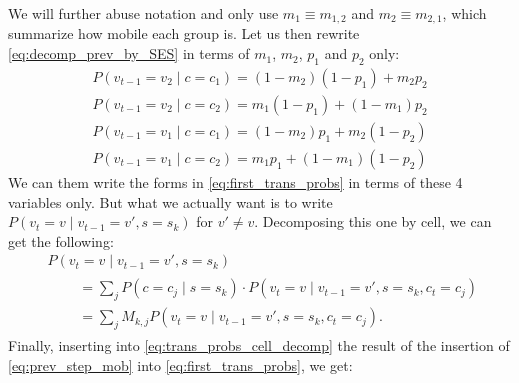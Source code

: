 \documentclass[../thesis.tex]{subfiles}
\begin{document}
We will further abuse notation and only use $m_1 \equiv
m_{1,2}$ and $m_2 \equiv m_{2, 1}$, which summarize how mobile each group is. Let us then rewrite
\eqref{eq:decomp_prev_by_SES} in terms of $m_1$, $m_2$, $p_1$ and $p_2$ only:
\begin{equation}
    \label{eq:prev_step_mob}
    \begin{aligned}
        P(v_{t-1} = v_2 \mid c = c_1)
            = (1 - m_2) (1 - p_1) + m_2 p_2
        \\
        P(v_{t-1} = v_2 \mid c = c_2)
            = m_1 (1 - p_1) + (1 - m_1) p_2
        \\
        P(v_{t-1} = v_1 \mid c = c_1)
            = (1 - m_2) p_1 + m_2 (1 - p_2)
        \\
        P(v_{t-1} = v_1 \mid c = c_2)
            = m_1 p_1 + (1 - m_1) (1 - p_2)
    \end{aligned}
\end{equation}
We can them write the forms in \eqref{eq:first_trans_probs} in terms of these 4
variables only. But what we actually want is to write $P(v_t = v \mid v_{t-1} = v', s
= s_k)$ for $v' \neq v$. Decomposing this one by cell, we can get the following:
\begin{equation}
    \label{eq:trans_probs_cell_decomp}
    \begin{aligned}
        & P(v_t = v \mid v_{t-1} = v', s = s_k)
        \\[1ex]
        &
        \begin{aligned}
            \quad & = \sum_j P(c = c_j \mid s = s_k)
            \cdot P(v_t = v \mid v_{t-1} = v', s = s_k, c_t = c_j)
        \\
            & = \sum_j M_{k, j} P(v_t = v \mid v_{t-1} = v', s = s_k, c_t = c_j).
        \end{aligned}
    \end{aligned}
\end{equation}
Finally, inserting into \eqref{eq:trans_probs_cell_decomp} the result of the insertion
of \eqref{eq:prev_step_mob} into \eqref{eq:first_trans_probs}, we get:
\end{document}
